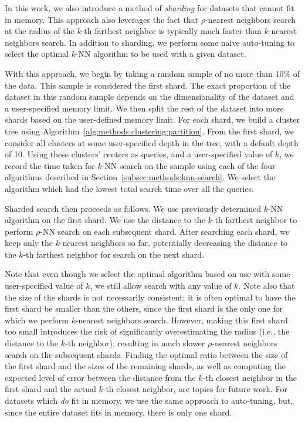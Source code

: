 In this work, we also introduce a method of \emph{sharding} for datasets that cannot fit in memory.
This approach also leverages the fact that $\rho$-nearest neighbors search at the radius of the $k$-th farthest neighbor is typically much faster than $k$-nearest neighbors search.
In addition to sharding, we perform some naive auto-tuning to select the optimal $k$-NN algorithm to be used with a given dataset.

With this approach, we begin by taking a random sample of no more than 10\% of the data.
This sample is considered the first shard.
The exact proportion of the dataset in this random sample depends on the dimensionality of the dataset and a user-specified memory limit. 
We then split the rest of the dataset into more shards based on the user-defined memory limit.
For each shard, we build a cluster tree using Algorithm~\ref{alg:methods:clustering:partition}.
From the first shard, we consider all clusters at some user-specified depth in the tree, with a default depth of 10.
Using these clusters' centers as queries, and a user-specified value of $k$, we record the time taken for $k$-NN search on the sample using each of the four algorithms described in Section~\ref{subsec:methods:knn-search}.
We select the algorithm which had the lowest total search time over all the queries. 

Sharded search then proceeds as follows.
We use previously determined $k$-NN algorithm on the first shard. 
We use the distance to the $k$-th farthest neighbor to perform $\rho$-NN search on each subsequent shard. 
After searching each shard, we keep only the $k$-nearest neighbors so far, potentially decreasing the distance to the $k$-th farthest neighbor for search on the next shard.

Note that even though we select the optimal algorithm based on use with some user-specified value of $k$, we still allow search with any value of $k$.
Note also that the size of the shards is not necessarily consistent;
it is often optimal to have the first shard be smaller than the others, since the first shard is the only one for which we perform $k$-nearest neighbors search. 
However, making this first shard too small introduces the risk of significantly overestimating the radius (i.e., the distance to the $k$-th neighbor), resulting in much slower $\rho$-nearest neighbors search on the subsequent shards.
Finding the optimal ratio between the size of the first shard and the sizes of the remaining shards, as well as computing the expected level of error between the distance from the $k$-th closest neighbor in the first shard and the actual $k$-th closest neighbor, are topics for future work.
For datasets which \emph{do} fit in memory, we use the same approach to auto-tuning, but, since the entire dataset fits in memory, there is only one shard. 


